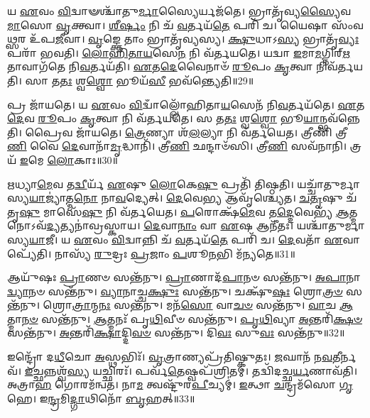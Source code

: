 𑌯 \ul{𑌏}\-𑌵𑌂 \ul{𑌵𑌿}\-𑌦𑍍𑌵𑌾𑍟𑌶𑍍𑌚𑌾᳴𑌤𑍁\-\ul{𑌰𑍍𑌮𑌾}\-𑌸𑍍𑌯𑍈𑌰𑍍𑌯𑌜᳴𑌤𑍇।
𑌭𑍍𑌰𑌾𑌤𑍃᳴𑌵𑍍𑌯\-\ul{𑌸𑍍𑌯𑍈}\-𑌵 \ul{𑌮𑌾}\-𑌸𑍋 \ul{𑌵𑍃}\-𑌕𑍍𑌤𑍍𑌵𑌾।
\-\ul{𑌶𑍀}\-\-\ul{𑌰𑍍}\-𑌷𑌂 𑌨𑌿 𑌚᳴ \ul{𑌵}\-𑌰𑍍𑌤𑌯᳴\-\ul{𑌤𑍇} 𑌪𑌰𑌿᳴ 𑌚।
𑌯𑍈𑌷𑌾 𑌸𑌂᳴𑌵\-\ul{𑌥𑍍𑌸}\-𑌰 𑌉᳴𑌪\-\ul{𑌜𑍀}\-𑌵𑌾।
\-\ul{𑌵𑍃}\-𑌙𑍍𑌕𑍍𑌤𑍇 𑌤𑌾𑌂 𑌭𑍍𑌰𑌾𑌤𑍃᳴𑌵𑍍𑌯𑌸𑍍𑌯।
\-\ul{𑌕𑍍𑌷𑍁}\-𑌧𑌾\-𑌽\-\ul{𑌸𑍍𑌯} 𑌭𑍍𑌰𑌾𑌤𑍃᳴\-\ul{𑌵𑍍𑌯𑌃} 𑌪𑌰𑌾᳴ 𑌭𑌵𑌤𑌿।
\-\ul{𑌲𑍋}\-\-\ul{𑌹𑌿}\-\-\ul{𑌤𑌾}\-\-\ul{𑌯}\-𑌸𑍇\-\ul{𑌨} 𑌨𑌿 𑌵᳴𑌰𑍍𑌤𑌯𑌤𑍇।
𑌯𑌦𑍍𑌵𑌾 \ul{𑌇}\-𑌮𑌾\-\ul{𑌮}\-𑌗𑍍𑌨𑌿𑌰𑍍\mbox{}\-\ul{𑌋}\-𑌤𑌾𑌵𑌾𑌗᳴𑌤𑍇 𑌨𑌿\-\ul{𑌵}\-𑌰𑍍𑌤𑌯᳴𑌤𑌿।
\-\ul{𑌏}\-𑌤\-\ul{𑌦𑍇}\-𑌵𑍈𑌨𑌾𑍞᳴ \ul{𑌰𑍂}\-𑌪𑌂 \ul{𑌕𑍃}\-𑌤𑍍𑌵𑌾 𑌨𑌿𑌵᳴𑌰𑍍𑌤𑌯𑌤𑌿।
𑌸𑌾 𑌤\-\ul{𑌤𑌃} 𑌶𑍍𑌵\-\ul{𑌶𑍍𑌵𑍋} 𑌭𑍂𑌯᳴\-\ul{𑌸𑍀} 𑌭𑌵᳴𑌨𑍍𑌤𑍍𑌯𑍇𑌤𑌿॥29॥

𑌪𑍍𑌰 𑌜𑌾᳴𑌯𑌤𑍇।
𑌯 \ul{𑌏}\-𑌵𑌂 \ul{𑌵𑌿}\-𑌦𑍍𑌵𑌾𑌁𑌲𑍍𑌲𑍋᳴𑌹𑌿𑌤𑌾\-\ul{𑌯}\-𑌸𑍇𑌨᳴ 𑌨𑌿\-\ul{𑌵}\-𑌰𑍍𑌤𑌯᳴𑌤𑍇।
\-\ul{𑌏}\-𑌤\-\ul{𑌦𑍇}\-𑌵 \ul{𑌰𑍂}\-𑌪𑌂 \ul{𑌕𑍃}\-𑌤𑍍𑌵𑌾 𑌨𑌿 𑌵᳴𑌰𑍍𑌤𑌯𑌤𑍇।
𑌸 𑌤\-\ul{𑌤𑌃} 𑌶𑍍𑌵\-\ul{𑌶𑍍𑌵𑍋} 𑌭𑍂\-\ul{𑌯𑌾}\-𑌨𑍍𑌭𑌵᳴𑌨𑍍𑌨𑍇𑌤𑌿।
𑌪𑍍𑌰𑍈𑌵 𑌜𑌾᳴𑌯𑌤𑍇।
\-\ul{𑌤𑍍𑌰𑍇}\-𑌣𑍍𑌯𑌾 𑌶᳴\-\ul{𑌲}\-𑌲𑍍𑌯𑌾 𑌨𑌿 𑌵᳴𑌰𑍍𑌤𑌯𑍇𑌤।
𑌤𑍍𑌰𑍀𑌣𑌿᳴ 𑌤𑍍𑌰𑍀\-\ul{𑌣𑌿} 𑌵𑍈 \ul{𑌦𑍇}\-𑌵𑌾𑌨𑌾᳴\-\ul{𑌮𑍃}\-𑌦𑍍𑌧𑌾𑌨𑌿᳴।
𑌤𑍍𑌰𑍀\-\ul{𑌣𑌿} 𑌛𑌨𑍍𑌦𑌾𑍞᳴𑌸𑌿।
𑌤𑍍𑌰𑍀\-\ul{𑌣𑌿} 𑌸𑌵᳴𑌨𑌾𑌨𑌿।
𑌤𑍍𑌰𑌯᳴ \ul{𑌇}\-𑌮𑍇 \ul{𑌲𑍋}\-𑌕𑌾𑌃॥30॥

\-\ul{𑌋}\-𑌧𑍍𑌯𑌾\-\ul{𑌮𑍇}\-𑌵 𑌤\-\ul{𑌦𑍍𑌵𑍀}\-𑌰𑍍𑌯᳴ \ul{𑌏}\-𑌷𑍁 \ul{𑌲𑍋}\-𑌕𑍇\-\ul{𑌷𑍁} 𑌪𑍍𑌰𑌤𑌿᳴ 𑌤𑌿𑌷𑍍𑌠𑌤𑌿।
𑌯𑌚𑍍𑌚𑌾᳴𑌤𑍁𑌰𑍍𑌮𑌾𑌸𑍍𑌯\-\-\ul{𑌯𑌾}\-𑌜𑍍𑌯𑌾॑𑌤𑍍𑌮\-\ul{𑌨𑍋} 𑌨𑌾\-\ul{𑌵}\-𑌦𑍍𑌯𑍇𑌤𑍍।
\-\ul{𑌦𑍇}\-𑌵𑍇\-\ul{𑌭𑍍𑌯} 𑌆𑌵𑍃᳴𑌶𑍍𑌚𑍍𑌯𑍇𑌤।
\-\ul{𑌚}\-\-\ul{𑌤𑍃}\-𑌷𑍁 𑌚᳴𑌤𑍃\-\ul{𑌷𑍁} 𑌮𑌾𑌸𑍇᳴\-\ul{𑌷𑍁} 𑌨𑌿 𑌵᳴𑌰𑍍𑌤𑌯𑍇𑌤।
\-\ul{𑌪}\-𑌰𑍋𑌕𑍍𑌷᳴\-\ul{𑌮𑍇}\-𑌵 𑌤\-\ul{𑌦𑍍𑌦𑍇}\-𑌵𑍇𑌭𑍍𑌯᳴ \ul{𑌆}\-𑌤𑍍𑌮𑌨𑍋\-𑌽𑌵᳴\-\ul{𑌦𑍍𑌯}\-𑌤𑍍𑌯𑌨𑌾॑\-𑌵𑍍𑌰𑌸𑍍𑌕𑌾𑌯।
\-\ul{𑌦𑍇}\-𑌵𑌾\-\ul{𑌨𑌾𑌂} 𑌵𑌾 \ul{𑌏}\-𑌷 𑌆𑌨𑍀᳴𑌤𑌃।
𑌯𑌶𑍍𑌚𑌾᳴𑌤𑍁𑌰𑍍𑌮𑌾𑌸𑍍𑌯\-\ul{𑌯𑌾}\-𑌜𑍀।
𑌯 \ul{𑌏}\-𑌵𑌂 \ul{𑌵𑌿}\-𑌦𑍍𑌵𑌾𑌨𑍍𑌨𑌿 𑌚᳴ \ul{𑌵}\-𑌰𑍍𑌤𑌯᳴\-\ul{𑌤𑍇} 𑌪𑌰𑌿᳴ 𑌚।
\-\ul{𑌦𑍇}\-𑌵𑌤𑌾᳴ \ul{𑌏}\-𑌵𑌾𑌪𑍍𑌯𑍇᳴𑌤𑌿।
𑌨𑌾𑌸𑍍𑌯᳴ \ul{𑌰𑍁}\-𑌦𑍍𑌰𑌃 \ul{𑌪𑍍𑌰}\-𑌜𑌾𑌂 \ul{𑌪}\-𑌶𑍂\-\ul{𑌨}\-𑌭𑌿 𑌮᳴𑌨𑍍𑌯𑌤𑍇॥31॥\anuvakamend[\-\ul{𑌏}\-\-\ul{𑌤𑍍𑌯𑍇}\-\-\ul{𑌤𑍍𑌯}\-\-\ul{𑌯𑍁}\-\-\ul{𑌞𑍍𑌜}\-𑌤𑌾𑌸𑍁᳴𑌰𑌾 𑌏𑌤𑌿 \ul{𑌲𑍋}\-𑌕𑌾 𑌮᳴𑌨𑍍𑌯𑌤𑍇]

𑌆𑌯𑍁᳴𑌷𑌃 \ul{𑌪𑍍𑌰𑌾}\-𑌣𑍞 𑌸𑌨𑍍𑌤᳴𑌨𑍁।
\-\ul{𑌪𑍍𑌰𑌾}\-𑌣𑌾𑌦᳴\-\ul{𑌪𑌾}\-𑌨𑍞 𑌸𑌨𑍍𑌤᳴𑌨𑍁।
\-\ul{𑌅}\-\-\ul{𑌪𑌾}\-𑌨𑌾\-\ul{𑌦𑍍𑌵𑍍𑌯𑌾}\-𑌨𑍞 𑌸𑌨𑍍𑌤᳴𑌨𑍁।
\-\ul{𑌵𑍍𑌯𑌾}\-𑌨𑌾𑌚𑍍𑌚\-\ul{𑌕𑍍𑌷𑍁𑌃} 𑌸𑌨𑍍𑌤᳴𑌨𑍁।
𑌚𑌕𑍍𑌷𑍁᳴\-\ul{𑌷𑌃} 𑌶𑍍𑌰𑍋\-\ul{𑌤𑍍𑌰}\-\-\ul{𑍞} 𑌸𑌨𑍍𑌤᳴𑌨𑍁।
𑌶𑍍𑌰𑍋\-\ul{𑌤𑍍𑌰𑌾}\-𑌨𑍍𑌮\-\ul{𑌨𑌃} 𑌸𑌨𑍍𑌤᳴𑌨𑍁।
𑌮𑌨᳴\-\ul{𑌸𑍋} 𑌵𑌾\-\ul{𑌚}\-\-\ul{𑍞} 𑌸𑌨𑍍𑌤᳴𑌨𑍁।
\-\ul{𑌵𑌾}\-𑌚 \ul{𑌆}\-𑌤𑍍𑌮𑌾\-\ul{𑌨}\-\-\ul{𑍞} 𑌸𑌨𑍍𑌤᳴𑌨𑍁।
\-\ul{𑌆}\-𑌤𑍍𑌮𑌨𑌃᳴ 𑌪𑍃\-\ul{𑌥𑌿}\-𑌵𑍀𑍞 𑌸𑌨𑍍𑌤᳴𑌨𑍁।
\-\ul{𑌪𑍃}\-\-\ul{𑌥𑌿}\-𑌵𑍍𑌯𑌾 \ul{𑌅}\-𑌨𑍍𑌤𑌰𑌿᳴\-\ul{𑌕𑍍𑌷}\-\-\ul{𑍞} 𑌸𑌨𑍍𑌤᳴𑌨𑍁।
\-\ul{𑌅}\-𑌨𑍍𑌤𑌰𑌿᳴\-\ul{𑌕𑍍𑌷𑌾}\-𑌦𑍍𑌦𑌿\-\ul{𑌵}\-\-\ul{𑍞} 𑌸𑌨𑍍𑌤᳴𑌨𑍁।
𑌦𑌿\-\ul{𑌵𑌃} 𑌸𑍁\-\ul{𑌵𑌃} 𑌸𑌨𑍍𑌤᳴𑌨𑍁॥32॥\anuvakamend[\-\ul{𑌅}\-𑌨𑍍𑌤𑌰𑌿᳴\-\ul{𑌕𑍍𑌷}\-\-\ul{𑍞} 𑌸𑌨𑍍𑌤᳴\-\ul{𑌨𑍁} 𑌦𑍍𑌵𑍇 𑌚᳴]

𑌇𑌨𑍍𑌦𑍍𑌰𑍋᳴ 𑌦\-\ul{𑌧𑍀}\-𑌚𑍋 \ul{𑌅}\-𑌸𑍍𑌥𑌭𑌿𑌃᳴।
\-\ul{𑌵𑍃}\-𑌤𑍍𑌰𑌾𑌣𑍍𑌯𑌪𑍍𑌰᳴𑌤𑌿𑌷𑍍𑌕𑍁𑌤𑌃।
\-\ul{𑌜}\-𑌘𑌾𑌨᳴ 𑌨\-\ul{𑌵}\-𑌤𑍀𑌰𑍍𑌨𑌵᳴।
\-\ul{𑌇}\-𑌚𑍍𑌛𑌨𑍍𑌨𑌶𑍍𑌵᳴\-\ul{𑌸𑍍𑌯} 𑌯𑌚𑍍𑌛𑌿𑌰𑌃᳴।
𑌪𑌰𑍍𑌵᳴\-\ul{𑌤𑍇}\-𑌷𑍍𑌵𑌪᳴𑌶𑍍𑌰𑌿𑌤𑌮𑍍।
𑌤𑌦𑍍𑌵𑌿᳴𑌦𑌚𑍍𑌛\-\ul{𑌰𑍍𑌯}\-𑌣𑌾𑌵᳴𑌤𑌿।
𑌅𑌤𑍍𑌰𑌾\-\ul{𑌹} 𑌗𑍋𑌰𑌮᳴𑌨𑍍𑌵𑌤।
𑌨𑌾\-\ul{𑌮} 𑌤𑍍𑌵𑌷𑍍𑌟𑍁᳴𑌰\-\ul{𑌪𑍀}\-𑌚𑍍𑌯𑌮𑍍॑।
\-\ul{𑌇}\-𑌤𑍍𑌥𑌾 \ul{𑌚}\-𑌨𑍍𑌦𑍍𑌰𑌮᳴𑌸𑍋 \ul{𑌗𑍃}\-𑌹𑍇।
𑌇\-\ul{𑌨𑍍𑌦𑍍𑌰}\-𑌮𑌿\-\ul{𑌦𑍍𑌗𑌾}\-𑌥𑌿𑌨𑍋᳴ \ul{𑌬𑍃}\-𑌹𑌤𑍍॥33॥

